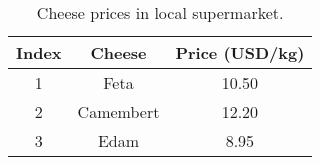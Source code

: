 \documentclass{article}
\begin{document}
\begin{table}[h]
    \centering
    \begin{tabular}{ccc}
        Index & Cheese & Price (USD/kg) \\ \hline
        1 & Feta & 10.50 \\
        2 & Camembert & 12.20 \\
        3 & Edam & 8.95 
    \end{tabular}
    \caption{Cheese prices in local supermarket.}
    \end{table}
\end{document}
